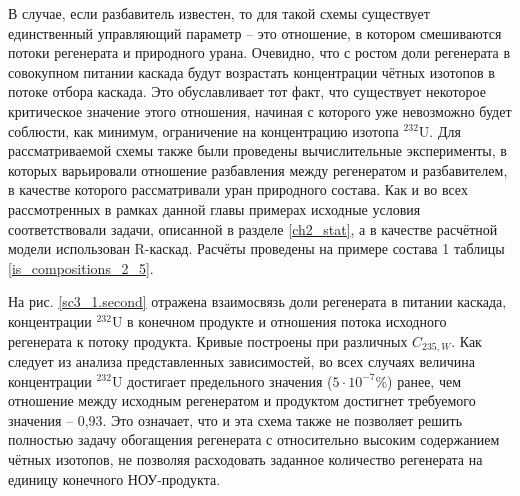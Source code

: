 В случае, если разбавитель известен, то для такой схемы существует единственный управляющий параметр -- это отношение, в котором смешиваются потоки регенерата и природного урана. Очевидно, что с ростом доли регенерата в совокупном питании каскада будут возрастать концентрации чётных изотопов в потоке отбора каскада. Это обуславливает тот факт, что существует некоторое критическое значение этого отношения, начиная с которого уже невозможно будет соблюсти, как минимум, ограничение на концентрацию изотопа $^{232}$U. Для рассматриваемой схемы также были проведены вычислительные эксперименты, в которых варьировали отношение разбавления между регенератом и разбавителем, в качестве которого рассматривали уран природного состава. Как и во всех рассмотренных в рамках данной главы примерах исходные условия соответствовали задачи, описанной в разделе \ref{ch2_stat}, а в качестве расчётной модели использован R-каскад. Расчёты проведены на примере состава 1 таблицы \ref{is_compositions_2_5}. 

На рис. \ref{sc3_1.second} отражена взаимосвязь доли регенерата в питании каскада, концентрации $^{232}$U в конечном продукте и отношения потока исходного регенерата к потоку продукта. Кривые построены при различных $C_{235, W}$. Как следует из анализа представленных зависимостей, во всех случаях величина концентрации  $^{232}$U достигает предельного значения ($5\cdot10^{-7}$\%) ранее, чем отношение между исходным регенератом и продуктом достигнет требуемого значения -- 0,93. Это означает, что и эта схема также не позволяет решить полностью задачу обогащения регенерата с относительно высоким содержанием чётных изотопов, не позволяя расходовать заданное количество регенерата на единицу конечного НОУ-продукта. 


